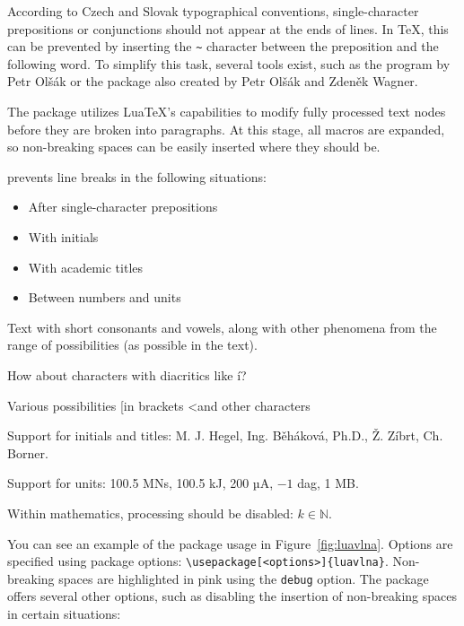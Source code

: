 \documentclass{ltugboat}
\begin{document}
{According to Czech and Slovak typographical conventions, single-character
prepositions or conjunctions should not appear at the ends of lines. In \TeX,
this can be prevented by inserting the \verb|~| character between the
preposition and the following word. To simplify this task, several tools exist,
such as the  program by Petr Olšák or the 
package also created by Petr Olšák and Zdeněk Wagner.

The  package \cite{luavlna} utilizes Lua\TeX's capabilities to
modify fully processed text nodes before they are broken into paragraphs. At
this stage, all macros are expanded, so non-breaking spaces can be easily
inserted where they should be.

 prevents line breaks in the following situations:

\begin{itemize}
  \item After single-character prepositions
  \item With initials
  \item With academic titles
  \item Between numbers and units
\end{itemize}

\begin{figure*}
  \begin{minipage}{3in}

    \preventsingledebugon

    Text with short consonants and vowels, along with other phenomena from the
    range of possibilities (as possible in the text).

    How about characters with diacritics like í?

    Various possibilities [in brackets \textless and other characters

    Support for initials and titles: M. J. Hegel, Ing. Běháková, Ph.D., Ž. Zíbrt, Ch. Borner.

    Support for units: 100.5 MN\cdot{}s, 100.5 kJ, 200 µA, $-1$ dag, 1 MB. 

    Within mathematics, processing should be disabled: $k \in \mathbb N$.

    \preventsingledebugoff
  \end{minipage}
  \caption{Example use of the Luavlna package}\label{fig:luavlna}
\end{figure*}

You can see an example of the package usage in Figure~\ref{fig:luavlna}.
Options are specified using package options:
\verb|\usepackage[<options>]{luavlna}|. Non-breaking spaces are highlighted in
pink using the \texttt{debug} option. The package offers several other options,
such as disabling the insertion of non-breaking spaces in certain situations:

}
\end{document}
